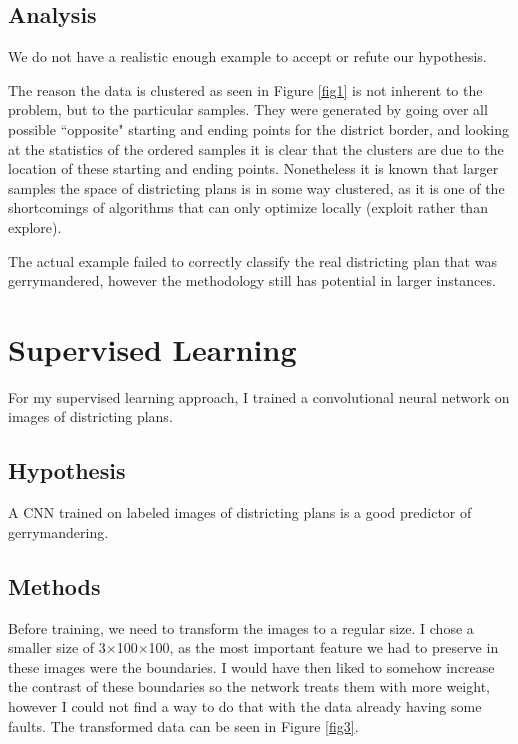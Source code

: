 \documentclass[a4paper]{article}
\theoremstyle{definition}
\begin{document}
	\subsection{Analysis}
	We do not have a realistic enough example to accept or refute our hypothesis.
	
	The reason the data is clustered as seen in Figure \ref{fig1} is not inherent to the problem, but to the particular samples. They were generated by going over all possible ``opposite" starting and ending points for the district border, and looking at the statistics of the ordered samples it is clear that the clusters are due to the location of these starting and ending points. Nonetheless it is known that larger samples the space of districting plans is in some way clustered, as it is one of the shortcomings of algorithms that can only optimize locally (exploit rather than explore).
	
	The actual example failed to correctly classify the real districting plan that was gerrymandered, however the methodology still has potential in larger instances.
	
	\section{Supervised Learning}
	For my supervised learning approach, I trained a convolutional neural network on images of districting plans.
	
	\subsection{Hypothesis}
	A CNN trained on labeled images of districting plans is a good predictor of gerrymandering.
	
	
	\subsection{Methods}
	Before training, we need to transform the images to a regular size. I chose a smaller size of 3$ \times $100$ \times $100, as the most important feature we had to preserve in these images were the boundaries. I would have then liked to somehow increase the contrast of these boundaries so the network treats them with more weight, however I could not find a way to do that with the data already having some faults. The transformed data can be seen in Figure \ref{fig3}.
	
\end{document}
